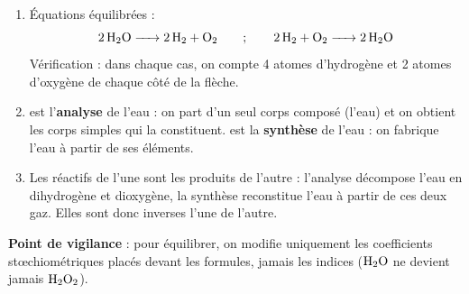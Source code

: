 \documentclass[11pt]{article}
\begin{document}
\begin{corrige}
\begin{enumerate}
\item Équations équilibrées :
\[\ce{2H2O -> 2H2 + O2} \qquad ; \qquad \ce{2H2 + O2 -> 2H2O}\]
Vérification : dans chaque cas, on compte 4 atomes d'hydrogène et 2 atomes d'oxygène de chaque côté de la flèche.
\item {} est l'\textbf{analyse} de l'eau : on part d'un seul corps composé (l'eau) et on obtient les corps simples qui la constituent.  est la \textbf{synthèse} de l'eau : on fabrique l'eau à partir de ses éléments.
\item Les réactifs de l'une sont les produits de l'autre : l'analyse décompose l'eau en dihydrogène et dioxygène, la synthèse reconstitue l'eau à partir de ces deux gaz. Elles sont donc inverses l'une de l'autre.
\end{enumerate}
\textbf{Point de vigilance} : pour équilibrer, on modifie uniquement les coefficients stœchiométriques placés devant les formules, jamais les indices ($\ce{H2O}$ ne devient jamais $\ce{H2O2}$).
\end{corrige}
\end{document}
